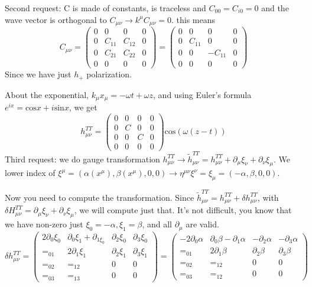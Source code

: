Second request: C is made of constants, is traceless and $C_{00} = C_{i0} = 0$ and the wave vector is orthogonal to $C_{\mu \nu } \to  k^{\mu }C_{\mu \nu } = 0$. this means
\[
C_{\mu \nu } = \begin{pmatrix}
0 & 0 & 0 & 0 \\
0 & C_{11} & C_{12} & 0 \\
0 & C_{21} & C_{22} & 0 \\
0 & 0 & 0 & 0
\end{pmatrix}  = \begin{pmatrix}
0 & 0 & 0 & 0 \\
0 & C_{11} & 0 & 0 \\
0 & 0 & -C_{11} & 0 \\
0 & 0 & 0 & 0
\end{pmatrix} 
\]
Since we have just $h_{+}$ polarization.\par
About the exponential, $k_{\mu }x_{\mu } = -\omega t + \omega z$, and using Euler's formula $e^{ix} = \text{cos}x + i \text{sin}x$, we get
\[
h^{TT}_{\mu \nu } = \begin{pmatrix}
0 & 0 & 0 & 0 \\
0 & C & 0 & 0 \\
0 & 0 & C & 0 \\
0 & 0 & 0 & 0
\end{pmatrix} \text{cos}\left( \omega \left( z-t \right) \right)	
\]
Third request: we do gauge transformation $h_{\mu \nu }^{TT} \to  \tilde{h}_{\mu \nu }^{TT} = h_{\mu \nu }^{TT} +\partial_{\mu }\xi _{\nu }+\partial_{\nu }\xi _{\mu }$.
We lower index of $\xi ^{\mu } = \left( \alpha \left( x^{\mu } \right), \beta \left( x^{\mu } \right), 0,0 \right) \to  \eta ^{\mu \nu }\xi ^{\nu } = \xi _{\mu } = \left( -\alpha ,\beta ,0,0 \right)$. \par
Now you need to compute the transformation. Since $\tilde{h}^{TT}_{\mu \nu } = h^{TT}_{\mu \nu } + \delta h^{TT}_{\mu \nu } $, with $\delta H^{TT}_{\mu \nu } = \partial_{\mu }\xi _{\nu} +\partial_{\nu }\xi _{\mu }$, we will compute just that. It's not difficult, you know that we have non-zero just $\xi _{0} =- \alpha , \xi _{1}=\beta $, and all $\partial_{\mu }$ are valid.
\begin{equation}
\delta h^{TT}_{\mu \nu } = \begin{pmatrix}
2\partial_{0}\xi _{0} & \partial_{0}\xi _{1}+\partial_{1\xi _{0}} & \partial_{2}\xi _{0} & \partial_{3}\xi _{0} \\
=_{01} & 2\partial_{1}\xi _{1} & \partial_{2}\xi _{1} & \partial_{3}\xi _{1} \\
=_{02} & =_{12} & 0 & 0 \\
=_{03} & =_{13} & 0 & 0
\end{pmatrix}  = \begin{pmatrix}
-2\partial_{0}\alpha  & \partial_{0}\beta -\partial_{1}\alpha  & -\partial_{2} \alpha   & -\partial_{3}\alpha  \\
=_{01} & 2\partial_{1}\beta  & \partial_{2}\beta  & \partial_{3}\beta  \\
=_{02} & =_{12} & 0 & 0 \\
=_{03} & =_{12} & 0 & 0
\end{pmatrix} 
\end{equation}
